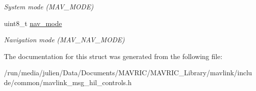 \begin{DoxyCompactItemize}
\begin{DoxyCompactList}\small\item\em System mode (M\+A\+V\+\_\+\+M\+O\+D\+E) \end{DoxyCompactList}\item 
\hypertarget{struct____mavlink__hil__controls__t_adcc556cd52256501a39b1f9e962ca5b6}{uint8\+\_\+t \hyperlink{struct____mavlink__hil__controls__t_adcc556cd52256501a39b1f9e962ca5b6}{nav\+\_\+mode}}\label{struct____mavlink__hil__controls__t_adcc556cd52256501a39b1f9e962ca5b6}

\begin{DoxyCompactList}\small\item\em Navigation mode (M\+A\+V\+\_\+\+N\+A\+V\+\_\+\+M\+O\+D\+E) \end{DoxyCompactList}\end{DoxyCompactItemize}


The documentation for this struct was generated from the following file\+:\begin{DoxyCompactItemize}
\item 
/run/media/julien/\+Data/\+Documents/\+M\+A\+V\+R\+I\+C/\+M\+A\+V\+R\+I\+C\+\_\+\+Library/mavlink/include/common/mavlink\+\_\+msg\+\_\+hil\+\_\+controls.\+h\end{DoxyCompactItemize}

